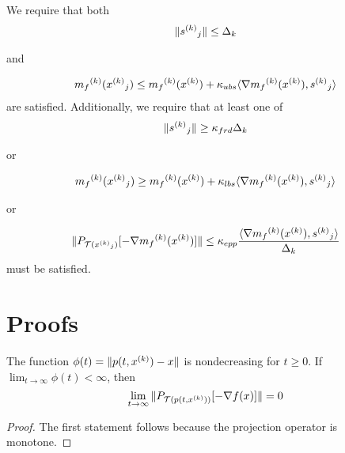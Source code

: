 \documentclass{article}
\begin{document}
We require that both
\begin{align}
\label{too_big_1}
\|{{s}^{(k)}}_{j}\|\le \Delta_k
\end{align}
\begin{center}and\end{center}
\begin{align}
\label{too_big_2}
{{m}_f}^{(k)}({{x}^{(k)}}_{j}) \le {{m}_f}^{(k)}({x}^{(k)}) + \kappa_{ubs}\langle \nabla{{m}_f}^{(k)}({x}^{(k)}), {{s}^{(k)}}_{j}\rangle
\end{align}
are satisfied.
Additionally, we require that at least one of
\begin{align}
\label{too_small_1}
\|{{s}^{(k)}}_{j}\| \ge \kappa_{frd}\Delta_k
\end{align}
\begin{center}or\end{center}
\begin{align}
\label{too_small_2}
{{m}_f}^{(k)}({{x}^{(k)}}_{j}) \ge {{m}_f}^{(k)}({x}^{(k)}) + \kappa_{lbs}\langle \nabla{{m}_f}^{(k)}({x}^{(k)}), {{s}^{(k)}}_{j}\rangle
\end{align}
\begin{center}or\end{center}
\begin{align}
\label{too_small_3}
\|P_{\mathcal T({{x}^{(k)}}_{j})}[-\nabla{{m}_f}^{(k)}({x}^{(k)})]\| \le \kappa_{epp} \frac{\langle \nabla{{m}_f}^{(k)}({x}^{(k)}), {{s}^{(k)}}_{j} \rangle}{\Delta_k}
\end{align}
must be satisfied.



\section{Proofs}

\begin{theorem}
\label{12_1_3}
The function $\phi(t) = \|p(t,{x}^{(k)})-x\|$ is nondecreasing for $t\ge0$.
If $\lim_{t\to\infty}\phi(t) < \infty$, then
\[
\lim_{t\to\infty}\|P_{\mathcal T(p(t,{x}^{(k)}))}[-\nabla f(x)]\| = 0
\]
\end{theorem}

\begin{proof}
The first statement follows because the projection operator is monotone.


\end{proof}
\end{document}
